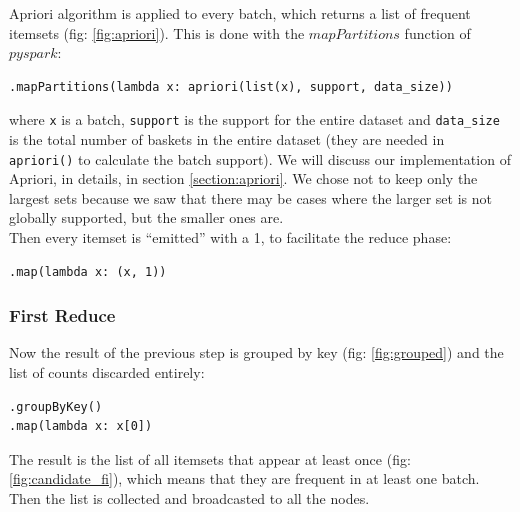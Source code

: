 \documentclass[a4paper]{article}
\begin{document}
	Apriori algorithm is applied to every batch, which returns a list of frequent itemsets (fig: \ref{fig:apriori}). This is done with the $mapPartitions$ function of $pyspark$: 
	\begin{lstlisting}[numbers=none]
.mapPartitions(lambda x: apriori(list(x), support, data_size))
\end{lstlisting}
	where \texttt{x} is a batch, \texttt{support} is the support for the entire dataset and \texttt{data\_size} is the total number of baskets in the entire dataset (they are needed in \texttt{apriori()} to calculate the batch support).
	We will discuss our implementation of Apriori, in details, in section \ref{section:apriori}. We chose not to keep only the largest sets because we saw that there may be cases where the larger set is not globally supported, but the smaller ones are.\\
	Then every itemset is ``emitted'' with a 1, to facilitate the reduce phase:
	\begin{lstlisting}[numbers=none]
.map(lambda x: (x, 1))
\end{lstlisting}
	
	\subsubsection{First Reduce}
	Now the result of the previous step is grouped by key (fig: \ref{fig:grouped}) and the list of counts discarded entirely:
	\begin{lstlisting}
.groupByKey()
.map(lambda x: x[0])
\end{lstlisting}
	The result is the list of all itemsets that appear at least once (fig: \ref{fig:candidate_fi}), which means that they are frequent in at least one batch.\\
	Then the list is collected and broadcasted to all the nodes.
	
\end{document}

